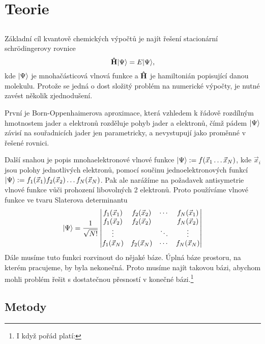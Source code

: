 \chapter{Teorie}
\section{}
Základní cíl kvantově chemických výpočtů je najít řešení stacionární schrödingerovy rovnice
\begin{equation}
\mathbf{\hat{H}}| \Psi \rangle = E| \Psi \rangle,
\end{equation}
kde $| \Psi \rangle$ je mnohačásticová vlnová funkce a $\mathbf{\hat{H}}$ je hamiltonián popisující 
danou molekulu.
Protože se jedná o dost složitý problém na numerické výpočty, je nutné zavést 
několik zjednodušení. 

První je Born-Oppenhaimerova aproximace, která vzhledem k řádově 
rozdílným hmotnostem jader a elektronů rozděluje pohyb jader a elektronů, čímž pádem 
$| \Psi \rangle$ závisí na souřadnicích jader jen parametricky, 
a nevystupují jako proměnné v 
řešené rovnici. 

Další snahou je popis mnohaelektronové vlnové funkce
$| \Psi \rangle:= f(\vec{x}_1 \dots \vec{x}_N)$, kde $\vec{x}_i$ jsou 
polohy jednotlivých elektronů, pomocí součinu jednoelektronových funkcí
$| \Psi \rangle:= f_1(\vec{x}_1)f_2(\vec{x}_2)\dots f_N(\vec{x}_N)$.
Pak ale narážíme na požadavek antisymetrie vlnové funkce vůči prohození libovolných 2 
elektronů. Proto používáme vlnové funkce ve tvaru Slaterova determinantu
\begin{equation}
| \Psi \rangle = \frac{1}{\sqrt{N!}}\begin{vmatrix}
f_1(\vec{x}_1) & f_2(\vec{x}_2)& \cdots & f_N(\vec{x}_1) \\
f_1(\vec{x}_2) & f_2(\vec{x}_2)&        & f_N(\vec{x}_2)\\
\vdots         &               & \ddots & \vdots \\
f_1(\vec{x}_N) & f_2(\vec{x}_N)& \cdots & f_N(\vec{x}_N)
\end{vmatrix}
\end{equation}
Dále musíme tuto funkci rozvinout do nějaké báze. Úplná báze prostoru, na kterém 
pracujeme, by byla nekonečná. Proto musíme najít takovou bázi, abychom mohli problém 
řešit s dostatečnou přesností v konečné bázi.\footnote{I když pořád platí: }
\section{Metody}
